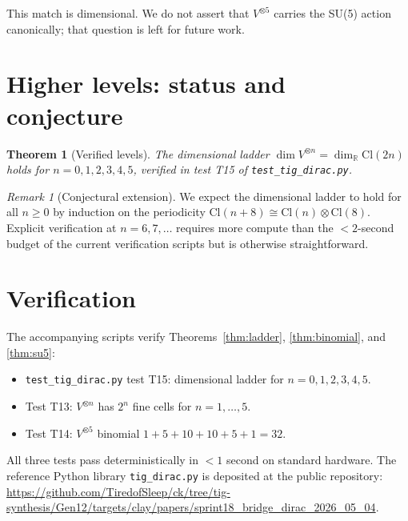\documentclass[11pt,reqno]{amsart}
\theoremstyle{plain}
\newtheorem{theorem}{Theorem}[section]
\theoremstyle{definition}
\theoremstyle{remark}
\newtheorem*{remark}{Remark}
\newcommand{\R}{\mathbb{R}}
\newcommand{\Cl}{\mathrm{Cl}}
\begin{document}
This match is dimensional. We do not assert that $V^{\otimes 5}$ carries
the SU(5) action canonically; that question is left for future work.

\section{Higher levels: status and conjecture}

\begin{theorem}[Verified levels]
The dimensional ladder $\dim V^{\otimes n} = \dim_\R \Cl(2n)$ holds for
$n = 0, 1, 2, 3, 4, 5$, verified in test T15 of \texttt{test\_tig\_dirac.py}.
\end{theorem}

\begin{remark}[Conjectural extension]
We expect the dimensional ladder to hold for all $n \geq 0$ by induction
on the periodicity $\Cl(n+8) \cong \Cl(n) \otimes \Cl(8)$. Explicit
verification at $n = 6, 7, \ldots$ requires more compute than the
$<2$-second budget of the current verification scripts but is otherwise
straightforward.
\end{remark}

\section{Verification}

The accompanying scripts verify Theorems~\ref{thm:ladder},
\ref{thm:binomial}, and \ref{thm:su5}:
\begin{itemize}
\item \texttt{test\_tig\_dirac.py} test T15: dimensional ladder for
$n = 0, 1, 2, 3, 4, 5$.
\item Test T13: $V^{\otimes n}$ has $2^n$ fine cells for $n = 1, \ldots, 5$.
\item Test T14: $V^{\otimes 5}$ binomial $1+5+10+10+5+1 = 32$.
\end{itemize}
All three tests pass deterministically in $<1$ second on standard
hardware. The reference Python library \texttt{tig\_dirac.py} is
deposited at the public repository:
\url{https://github.com/TiredofSleep/ck/tree/tig-synthesis/Gen12/targets/clay/papers/sprint18_bridge_dirac_2026_05_04}.

\end{document}
